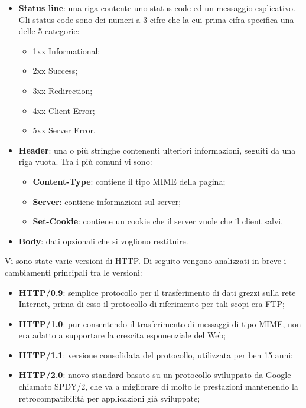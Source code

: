         \begin{itemize}
            \item \textbf{Status line}: una riga contente uno status code ed un messaggio esplicativo. Gli status
            code sono dei numeri a 3 cifre che la cui prima cifra specifica una delle 5 categorie:

            \begin{itemize}
                \item 1xx Informational;
                \item 2xx Success;
                \item 3xx Redirection;
                \item 4xx Client Error;
                \item 5xx Server Error.
            \end{itemize}

            \item \textbf{Header}: una o più stringhe contenenti ulteriori informazioni, seguiti da una riga vuota.
            Tra i più comuni vi sono:

            \begin{itemize}
                \item \textbf{Content-Type}: contiene il tipo MIME della pagina;
                \item \textbf{Server}: contiene informazioni sul server;
                \item \textbf{Set-Cookie}: contiene un cookie che il server vuole che il client salvi.
            \end{itemize}

            \item \textbf{Body}: dati opzionali che si vogliono restituire.
        \end{itemize}

    Vi sono state varie versioni di HTTP. Di seguito vengono analizzati in breve i cambiamenti
    principali tra le versioni:

        \begin{itemize}
            \item \textbf{HTTP/0.9}: semplice protocollo per il trasferimento di dati grezzi sulla rete Internet,
            prima di esso il protocollo di riferimento per tali scopi era FTP;
            \item \textbf{HTTP/1.0}: pur consentendo il trasferimento di messaggi di tipo MIME, non era adatto
            a supportare la crescita esponenziale del Web;
            \item \textbf{HTTP/1.1}: versione consolidata del protocollo, utilizzata per ben 15 anni;
            \item \textbf{HTTP/2.0}: nuovo standard basato su un protocollo sviluppato da Google chiamato
            SPDY/2, che va a migliorare di molto le prestazioni mantenendo la retrocompatibilità
            per applicazioni già sviluppate;
        \end{itemize}

